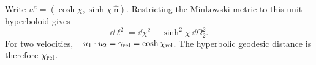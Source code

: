 \begin{enumerate}[leftmargin=2.8em,itemsep=1.2em]
Write \(u^a=(\cosh\chi,\sinh\chi\,\widehat{\bm n})\).  Restricting the
Minkowski metric to this unit hyperboloid gives
\[
 \dd\ell^2=\dd\chi^2+\sinh^2\chi\,\dd\Omega_2^2.
\]
For two velocities, \(-u_1\cdot u_2=\gamma_{\rm rel}=\cosh\chi_{\rm rel}\).
The hyperbolic geodesic distance is therefore \(\chi_{\rm rel}\).
\end{enumerate}
